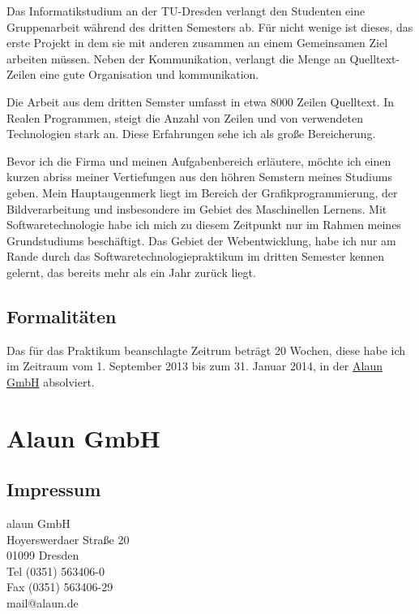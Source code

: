 \documentclass[12pt]{article}
\begin{document}
Das Informatikstudium an der TU-Dresden verlangt den Studenten eine Gruppenarbeit während des dritten Semesters
ab. Für nicht wenige ist dieses, das erste Projekt in dem sie mit anderen zusammen an einem Gemeinsamen Ziel
arbeiten müssen. Neben der Kommunikation, verlangt die Menge an Quelltext-Zeilen eine gute Organisation und
kommunikation. 

Die Arbeit aus dem dritten Semster umfasst in etwa 8000 Zeilen Quelltext. In Realen Programmen, steigt die
Anzahl von Zeilen und von verwendeten Technologien stark an. Diese Erfahrungen sehe ich als große Bereicherung.

Bevor ich die Firma und meinen Aufgabenbereich erläutere, möchte ich einen kurzen abriss meiner Vertiefungen
aus den höhren Semstern meines Studiums geben. Mein Hauptaugenmerk liegt im Bereich der Grafikprogrammierung,
der Bildverarbeitung und insbesondere im Gebiet des Maschinellen Lernens. Mit Softwaretechnologie habe ich mich
zu diesem Zeitpunkt nur im Rahmen meines Grundstudiums beschäftigt. Das Gebiet der Webentwicklung, habe ich nur
am Rande durch das Softwaretechnologiepraktikum im dritten Semester kennen gelernt, das bereits mehr als ein
Jahr zurück liegt. 

\subsection{Formalitäten}

Das für das Praktikum beanschlagte Zeitrum beträgt 20 Wochen, diese habe ich im Zeitraum vom 1. September 2013
bis zum 31. Januar 2014, in der \href{https://alaun.de/home/}{Alaun GmbH} absolviert.

\section{Alaun GmbH}

\subsection{Impressum}

\begin{minipage}{\linewidth}

alaun GmbH \\
Hoyerswerdaer Straße 20 \\
01099 Dresden \\

Tel (0351) 563406-0  \\
Fax (0351) 563406-29 \\

mail@alaun.de 

\end{minipage}
\end{document}
